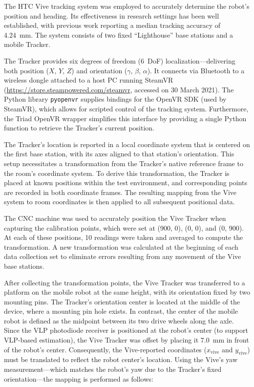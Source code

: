 The HTC Vive tracking system was employed to accurately determine the robot's position and heading. 
Its effectiveness in research settings has been well established, with previous work reporting a median tracking accuracy of 4.24~mm. 
The system consists of two fixed ``Lighthouse'' base stations and a mobile Tracker.

The Tracker provides six degrees of freedom (6~DoF) localization---delivering both position (\(X\), \(Y\), \(Z\)) and orientation (\(\gamma\), \(\beta\), \(\alpha\)). 
It connects via Bluetooth to a wireless dongle attached to a host PC running SteamVR (\url{https://store.steampowered.com/steamvr}, accessed on 30 March 2021). 
The Python library \texttt{pyopenvr} supplies bindings for the OpenVR SDK (used by SteamVR), which allows for scripted control of the tracking system. 
Furthermore, the Triad OpenVR wrapper simplifies this interface by providing a single Python function to retrieve the Tracker's current position.

The Tracker's location is reported in a local coordinate system that is centered on the first base station, with its axes aligned to that station's orientation. 
This setup necessitates a transformation from the Tracker's native reference frame to the room's coordinate system. 
To derive this transformation, the Tracker is placed at known positions within the test environment, and corresponding points are recorded in both coordinate frames. 
The resulting mapping from the Vive system to room coordinates is then applied to all subsequent positional data.

The CNC machine was used to accurately position the Vive Tracker when capturing the calibration points, which were set at (900, 0), (0, 0), and (0, 900). 
At each of these positions, 10 readings were taken and averaged to compute the transformation. 
A new transformation was calculated at the beginning of each data collection set to eliminate errors resulting from any movement of the Vive base stations.

After collecting the transformation points, the Vive Tracker was transferred to a platform on the mobile robot at the same height, with its orientation fixed by two mounting pins. 
The Tracker's orientation center is located at the middle of the device, where a mounting pin hole exists. 
In contrast, the center of the mobile robot is defined as the midpoint between its two drive wheels along the axle. 
Since the VLP photodiode receiver is positioned at the robot's center (to support VLP-based estimation), the Vive Tracker was offset by placing it 7.0~mm in front of the robot's center. 
Consequently, the Vive-reported coordinates (\(x_{\text{vive}}\) and \(y_{\text{vive}}\)) must be translated to reflect the robot center's location. 
Using the Vive's yaw measurement---which matches the robot's yaw due to the Tracker's fixed orientation---the mapping is performed as follows:

